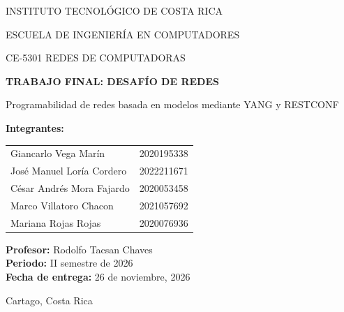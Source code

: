 \lstset{style=codigo}


\justifying
\setlength{\emergencystretch}{3em}

\begin{titlepage}
  \centering
  {\large INSTITUTO TECNOLÓGICO DE COSTA RICA\par}
  {\large ESCUELA DE INGENIERÍA EN COMPUTADORES\par}
  \vspace{1.2cm}
  {\large CE-5301 REDES DE COMPUTADORAS\par}
  \vspace{1.6cm}
  {\LARGE\bfseries TRABAJO FINAL: DESAFÍO DE REDES\par}
  \vspace{0.7cm}
  {\Large Programabilidad de redes basada en modelos mediante YANG y RESTCONF\par}
  \vspace{1.4cm}
  {\large\bfseries Integrantes:\par}
  \vspace{0.3cm}
  \begin{tabular}{ll}
    Giancarlo Vega Marín & 2020195338 \\
    José Manuel Loría Cordero & 2022211671 \\
    César Andrés Mora Fajardo & 2020053458 \\
    Marco Villatoro Chacon & 2021057692 \\
    Mariana Rojas Rojas & 2020076936 \\
  \end{tabular}\par
  \vfill
  \begin{flushleft}
    \textbf{Profesor:} Rodolfo Tacsan Chaves\\
    \textbf{Periodo:} II semestre de 2026\\
    \textbf{Fecha de entrega:} 26 de noviembre, 2026
  \end{flushleft}
  \vspace{1cm}
  {Cartago, Costa Rica\par}
\end{titlepage}

